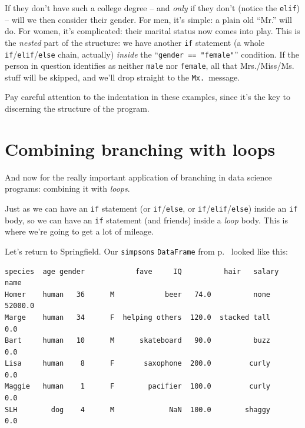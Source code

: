 If they don't have such a college degree -- and \textit{only} if they don't
(notice the \texttt{elif}) -- will we then consider their gender. For men, it's
simple: a plain old ``Mr.'' will do. For women, it's complicated: their marital
status now comes into play. This is the \textit{nested} part of the structure:
we have another \texttt{if} statement (a whole
\texttt{if}/\texttt{elif}/\texttt{else} chain, actually) \textit{inside} the
``\texttt{gender == "female"}'' condition. If the person in question identifies
as neither \texttt{male} nor \texttt{female}, all that Mrs./Miss/Ms. stuff will
be skipped, and we'll drop straight to the \texttt{Mx.}~message.


Pay careful attention to the indentation in these examples, since it's the key
to discerning the structure of the program.


\section{Combining branching with loops}


And now for the really important application of branching in data science
programs: combining it with \textit{loops}.

Just as we can have an \texttt{if} statement (or \texttt{if}/\texttt{else}, or
\texttt{if}/\texttt{elif}/\texttt{else}) inside an \texttt{if} body, so we can
have an \texttt{if} statement (and friends) inside a \textit{loop} body. This
is where we're going to get a lot of mileage.

Let's return to Springfield. Our \texttt{simpsons} \texttt{DataFrame} from
p.~\pageref{finalSimpsons} looked like this:

\begin{Verbatim}[fontsize=\CBCodeSmall,samepage=true,frame=leftline,framesep=5mm,framerule=1mm]
       species  age gender            fave     IQ          hair   salary
name                                                                    
Homer    human   36      M            beer   74.0          none  52000.0
Marge    human   34      F  helping others  120.0  stacked tall      0.0
Bart     human   10      M      skateboard   90.0          buzz      0.0
Lisa     human    8      F       saxophone  200.0         curly      0.0
Maggie   human    1      F        pacifier  100.0         curly      0.0
SLH        dog    4      M             NaN  100.0        shaggy      0.0
\end{Verbatim}

